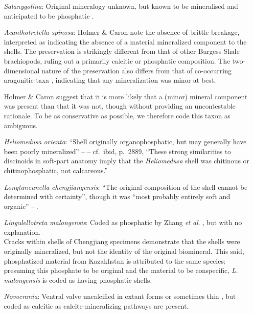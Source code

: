 \documentclass[openany]{book}
\theoremstyle{definition}
\theoremstyle{definition}
\theoremstyle{definition}
\theoremstyle{remark}
\begin{document}
\emph{Salanygolina}: Original mineralogy unknown, but known to be
mineralised and anticipated to be phosphatic
\citep{Holmer2009Theenigmatic}.

\emph{Acanthotretella spinosa}: Holmer \& Caron
\citeyearpar{Holmer2006Aspinose} note the absence of brittle breakage,
interpreted as indicating the absence of a material mineralized
component to the shells. The preservation is strikingly different from
that of other Burgess Shale brachiopods, ruling out a primarily calcitic
or phosphatic composition. The two-dimensional nature of the
preservation also differs from that of co-occurring aragonitic taxa
\citep[hyoliths;][ p.~273]{Holmer2006Aspinose}, indicating that any
mineralization was minor at best.

Holmer \& Caron \citeyearpar[p.~286]{Holmer2006Aspinose} suggest that it
is more likely that a (minor) mineral component was present than that it
was not, though without providing an uncontestable rationale. To be as
conservative as possible, we therefore code this taxon as ambiguous.

\emph{Heliomedusa orienta}: ``Shell originally organophosphatic, but may
generally have been poorly mineralized'' -- \citet{Williams2007PartH} --
cf.~ibid, p.~2889, ``These strong similarities to discinoids in
soft-part anatomy imply that the \emph{Heliomedusa} shell was chitinous
or chitinophosphatic, not calcareous.''

\emph{Longtancunella chengjiangensis}: ``The original composition of the
shell cannot be determined with certainty'', though it was ``most
probably entirely soft and organic'' --
\citet{Zhang2011Theexceptionally}.

\emph{Lingulellotreta malongensis}: Coded as phosphatic by Zhang
\emph{et al}. \citeyearpar{Zhang2014Anearly}, but with no explanation.\\
Cracks within shells of Chengjiang specimens \citep[e.g.][fig.
3]{Zhang2007Noteon} demonstrate that the shells were originally
mineralized, but not the identity of the original biomineral. This said,
phosphatized material from Kazakhstan \citep{Holmer1997EarlyCambrian} is
attributed to the same species; presuming this phosphate to be original
and the material to be conspecific, \emph{L. malongensis} is coded as
having phosphatic shells.

\emph{Novocrania}: Ventral valve uncalcified in extant forms or
sometimes thin \citep{Williams2000BrachiopodaLinguliformea}, but coded
as calcitic as calcite-mineralizing pathways are present.
\end{document}
